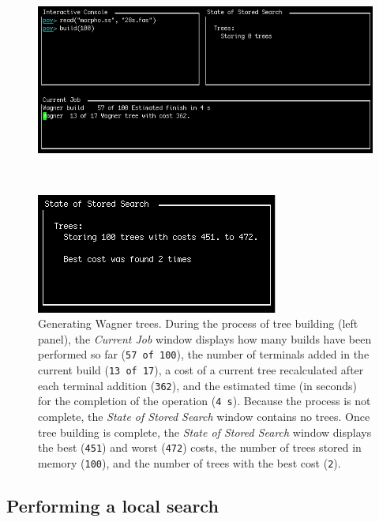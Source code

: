 {\begin{figure}
\centering
\begin{minipage}[c]{0.507\textwidth}
   		\includegraphics[width=\textwidth]{doc/figures/building1.jpg}
\end{minipage}
\,
\begin{minipage}[c]{0.453\textwidth}
	   	\includegraphics[width=\textwidth]{doc/figures/building2.jpg}
   	\end{minipage}
\caption{Generating Wagner trees. During the process of tree building (left panel), the \emph{Current Job} window displays how many builds have been performed so far (\texttt{57 of 100}), the number of terminals added in the current build (\texttt{13 of 17}), a cost of a current tree recalculated after each terminal addition (\texttt{362}), and the estimated time (in seconds) for the completion of the operation (\texttt{4 s}). Because the process is not complete, the \emph{State of Stored Search} window contains no trees. Once tree building is complete, the \emph{State of Stored Search} window displays the best (\texttt{451}) and worst (\texttt{472}) costs, the number of trees stored in memory (\texttt{100}), and the number of trees with the best cost (\texttt{2}).} 
\label{fig:building}
\end{figure}

\subsection{Performing a local search}

}

